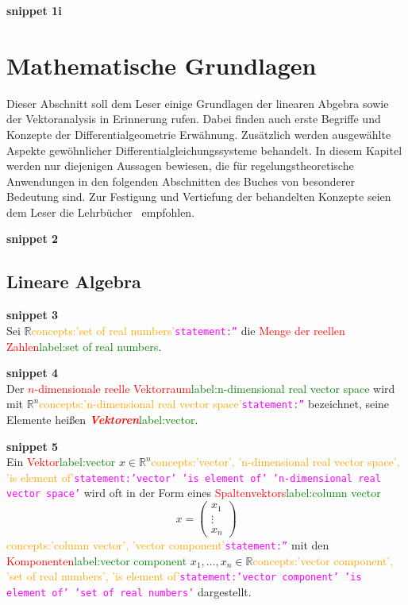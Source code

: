 \documentclass[a4paper,twoside,english,ngerman,deutsch,german,sectrefs,envcountsame,envcountchap]{svmono}
\newcommand{\setref}[2]{\textcolor{red}{#1}\textcolor{green}{#2}}
\newcommand{\snippet}[1]{\textbf{snippet #1}\\}
\newcommand{\eqnote}[2]{\textcolor{orange}{#1}\textcolor{magenta}{\texttt{#2}}}
\begin{document}
\snippet{1i}


\chapter{Mathematische Grundlagen\label{cha:Grundlagen}}
Dieser Abschnitt soll dem Leser einige Grundlagen der linearen Abgebra sowie der Vektoranalysis in Erinnerung rufen. Dabei finden auch erste Begriffe und Konzepte der Differentialgeometrie Erwähnung. Zusätzlich werden ausgewählte Aspekte gewöhnlicher Differentialgleichungssysteme behandelt. In diesem Kapitel werden nur diejenigen Aussagen bewiesen, die für regelungstheoretische Anwendungen in den folgenden Abschnitten des Buches von besonderer Bedeutung sind. Zur Festigung und Vertiefung der behandelten Konzepte seien dem Leser die Lehrbücher~\cite{arnold2001,kerner2007} empfohlen.


\snippet{2}


\section{Lineare Algebra\label{sec:Lineare-Algebra}}


\snippet{3}
Sei ${\mathbb{R}}$\eqnote{concepts:'set of real numbers'}{statement:''} die \setref{Menge der reellen Zahlen}{label:set of real numbers}.

\snippet{4}
Der \setref{$n$-dimensionale reelle Vektorraum}{label:n-dimensional real vector space} wird mit ${\mathbb{R}}^{n}$\eqnote{concepts:'n-dimensional real vector space'}{statement:''} bezeichnet, seine Elemente heißen \setref{\textbf{\em Vektoren}}{label:vector}.

\snippet{5}
Ein \setref{Vektor}{label:vector} $x\in{\mathbb{R}}^{n}$\eqnote{concepts:'vector', 'n-dimensional real vector space', 'is element of'}{statement:'vector' 'is element of' 'n-dimensional real vector space'} wird oft in der Form eines \setref{Spaltenvektors}{label:column vector}
\begin{equation}
x=\left(\begin{array}{c} x_{1}\\
\vdots\\
x_{n}
\end{array}\right)\label{eq:vektor-x}
\end{equation}\eqnote{concepts:'column vector', 'vector component'}{statement:''}
mit den \setref{Komponenten}{label:vector component} $x_{1},\ldots,x_{n}\in{\mathbb{R}}$\eqnote{concepts:'vector component', 'set of real numbers', 'is element of'}{statement:'vector component' 'is element of' 'set of real numbers'} dargestellt.
\end{document}
